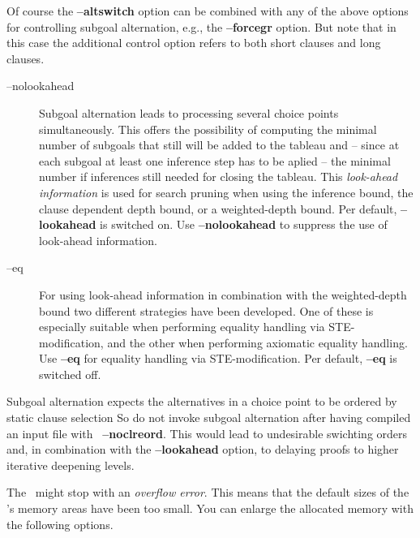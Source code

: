 \begin{remark}
  Of course the {\bf --altswitch} option can be combined
  with any of the above options for controlling subgoal
  alternation, e.g., the {\bf --forcegr} option. But note
  that in this case the additional control option refers to
  both short clauses and long clauses.
\end{remark}

\begin{description}
      \item [--\lb no\rb lookahead]
            Subgoal alternation leads to processing several choice
            points simultaneously.
            This offers the possibility of computing the minimal
            number of subgoals that still will be added to the
            tableau and -- since at each subgoal at least one
            inference step has to be aplied -- the minimal number if
            inferences still needed for closing the tableau.
            This {\em look-ahead information\/} is used for search
            pruning when using the inference bound, the clause
            dependent depth bound, or a weighted-depth bound.
            Per default, {\bf --lookahead} is switched on.
            Use {\bf --nolookahead} to suppress the use of look-ahead
            information.  
      \item [--eq]
            For using look-ahead information in combination with the
            weighted-depth bound two different strategies have been
            developed. 
            One of these is especially suitable when performing
            equality handling via STE-modification, and the other when
            performing axiomatic equality handling.
            Use {\bf --eq} for equality handling via STE-modification.
            Per default, {\bf --eq} is switched off. 
\end{description}

\begin{remark}
  Subgoal alternation expects the alternatives in a choice point to be
  ordered by static clause selection
  So do not invoke subgoal alternation after having compiled an input
  file with \inw\ {\bf --noclreord}.
  This would lead to undesirable swichting orders and, in combination
  with the {\bf --lookahead} option, to delaying proofs to higher
  iterative deepening levels.
\end{remark}

The \SAM\ might stop with an {\it overflow error\/}. This means
that the default sizes of the \SAM's memory areas have been too
small. You can enlarge the allocated memory with the following
options. 

